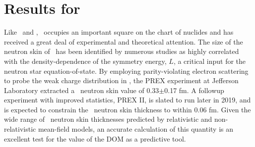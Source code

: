 \section{Results for \pbEight}
Like \caForty\ and \oSix, \pbEight\ occupies an important square on the chart of nuclides and has
received a great deal of experimental and theoretical attention. 
The size of the neutron skin of \pbEight\ has been identified by numerous studies as highly
correlated with the density-dependence of the symmetry energy, $L$, a critical input for the neutron
star equation-of-state. By employing parity-violating electron scattering to probe the
weak charge distribution in \pbEight, the PREX experiment at Jefferson Laboratory extracted a
\pbEight\ neutron skin value of 0.33$\pm$0.17 fm. A followup experiment with improved statistics, PREX II,
is slated to run later in 2019, and is expected to constrain the \pbEight\ neutron skin thickness to
within 0.06 fm. Given the wide range of \pbEight\ neutron skin thicknesses predicted by relativistic
and non-relativistic mean-field models, an accurate calculation of this quantity is an excellent
test for the value of the DOM as a predictive tool.


